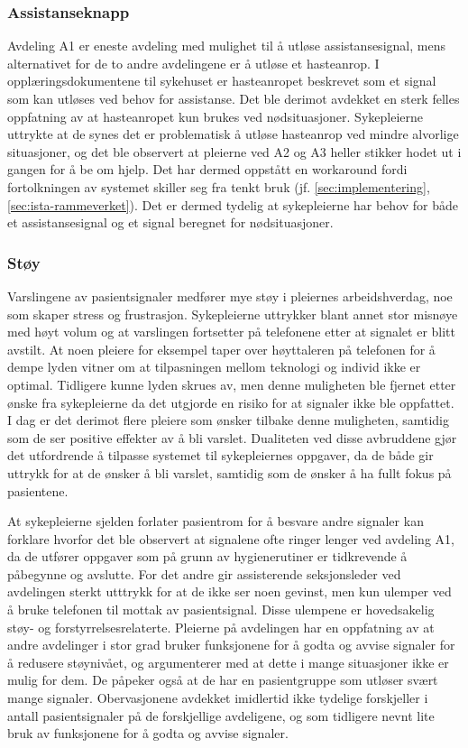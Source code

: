 \subsubsection{Assistanseknapp}
Avdeling A1 er eneste avdeling med mulighet til å utløse assistansesignal, mens alternativet for de to andre avdelingene er å utløse et hasteanrop. I opplæringsdokumentene til sykehuset er hasteanropet beskrevet som et signal som kan utløses ved behov for assistanse. Det ble derimot avdekket en sterk felles oppfatning av at hasteanropet kun brukes ved nødsituasjoner. Sykepleierne uttrykte at de synes det er problematisk å utløse hasteanrop ved mindre alvorlige situasjoner, og det ble observert at pleierne ved A2 og A3 heller stikker hodet ut i gangen for å be om hjelp. Det har dermed oppstått en workaround fordi fortolkningen av systemet skiller seg fra tenkt bruk (jf. \ref{sec:implementering}, \ref{sec:ista-rammeverket}). Det er dermed tydelig at sykepleierne har behov for både et assistansesignal og et signal beregnet for nødsituasjoner.
  
\subsubsection{Støy}
Varslingene av pasientsignaler medfører mye støy i pleiernes arbeidshverdag, noe som skaper stress og frustrasjon. Sykepleierne uttrykker blant annet stor misnøye med høyt volum og at varslingen fortsetter på telefonene etter at signalet er blitt avstilt. At noen pleiere for eksempel taper over høyttaleren på telefonen for å dempe lyden vitner om at tilpasningen mellom teknologi og individ ikke er optimal. Tidligere kunne lyden skrues av, men denne muligheten ble fjernet etter ønske fra sykepleierne da det utgjorde en risiko for at signaler ikke ble oppfattet. I dag er det derimot flere pleiere som ønsker tilbake denne muligheten, samtidig som de ser positive effekter av å bli varslet. Dualiteten ved disse avbruddene gjør det utfordrende å tilpasse systemet til sykepleiernes oppgaver, da de både gir uttrykk for at de ønsker å bli varslet, samtidig som de ønsker å ha fullt fokus på pasientene. 

\noindent
At sykepleierne sjelden forlater pasientrom for å besvare andre signaler kan forklare hvorfor det ble observert at signalene ofte ringer lenger ved avdeling A1, da de utfører oppgaver som på grunn av hygienerutiner er tidkrevende å påbegynne og avslutte. For det andre gir assisterende seksjonsleder ved avdelingen sterkt utttrykk for at de ikke ser noen gevinst, men kun ulemper ved å bruke telefonen til mottak av pasientsignal. Disse ulempene er hovedsakelig støy- og forstyrrelsesrelaterte. Pleierne på avdelingen har en oppfatning av at andre avdelinger i stor grad bruker funksjonene for å godta og avvise signaler for å redusere støynivået, og argumenterer med at dette i mange situasjoner ikke er mulig for dem. De påpeker også at de har en pasientgruppe som utløser svært mange signaler. Obervasjonene avdekket imidlertid ikke tydelige forskjeller i antall pasientsignaler på de forskjellige avdeligene, og som tidligere nevnt lite bruk av funksjonene for å godta og avvise signaler.

